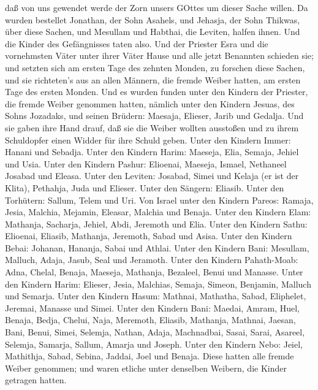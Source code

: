 daß von uns gewendet werde der Zorn unsers GOttes um dieser Sache
willen.  Da wurden bestellet Jonathan, der Sohn Asahels,
und Jehasja, der Sohn Thikwas, über diese Sachen, und Mesullam und
Habthai, die Leviten, halfen ihnen.  Und die Kinder des
Gefängnisses taten also. Und der Priester Esra und die vornehmsten Väter
unter ihrer Väter Hause und alle jetzt Benannten schieden sie; und
setzten sich am ersten Tage des zehnten Monden, zu forschen diese
Sachen,  und sie richteten's aus an allen Männern, die
fremde Weiber hatten, am ersten Tage des ersten Monden. 
Und es wurden funden unter den Kindern der Priester, die fremde Weiber
genommen hatten, nämlich unter den Kindern Jesuas, des Sohns Jozadaks,
und seinen Brüdern: Maesaja, Elieser, Jarib und Gedalja. 
Und sie gaben ihre Hand drauf, daß sie die Weiber wollten ausstoßen und
zu ihrem Schuldopfer einen Widder für ihre Schuld geben. 
Unter den Kindern Immer: Hanani und Sebadja.  Unter den
Kindern Harim: Maeseja, Elia, Semaja, Jehiel und Usia. 
Unter den Kindern Pashur: Elioenai, Maeseja, Ismael, Nethaneel Josabad
und Eleasa.  Unter den Leviten: Josabad, Simei und Kelaja
(er ist der Klita), Pethahja, Juda und Elieser.  Unter den
Sängern: Eliasib. Unter den Torhütern: Sallum, Telem und Uri.
 Von Israel unter den Kindern Pareos: Ramaja, Jesia,
Malchia, Mejamin, Eleasar, Malchia und Benaja.  Unter den
Kindern Elam: Mathanja, Sacharja, Jehiel, Abdi, Jeremoth und Elia.
 Unter den Kindern Sathu: Elioenai, Eliasib, Mathanja,
Jeremoth, Sabad und Asisa.  Unter den Kindern Bebai:
Johanan, Hananja, Sabai und Athlai.  Unter den Kindern
Bani: Mesullam, Malluch, Adaja, Jasub, Seal und Jeramoth. 
Unter den Kindern Pahath-Moab: Adna, Chelal, Benaja, Maeseja, Mathanja,
Bezaleel, Benui und Manasse.  Unter den Kindern Harim:
Elieser, Jesia, Malchias, Semaja, Simeon,  Benjamin,
Malluch und Semarja.  Unter den Kindern Hasum: Mathnai,
Mathatha, Sabad, Eliphelet, Jeremai, Manasse und Simei. 
Unter den Kindern Bani: Maedai, Amram, Huel,  Benaja,
Bedja, Chelui,  Naja, Meremoth, Eliasib, 
Mathanja, Mathnai, Jaesan,  Bani, Benui, Simei,
 Selemja, Nathan, Adaja,  Machnadbai, Sasai,
Sarai,  Asareel, Selemja, Samarja,  Sallum,
Amarja und Joseph.  Unter den Kindern Nebo: Jeiel,
Mathithja, Sabad, Sebina, Jaddai, Joel und Benaja.  Diese
hatten alle fremde Weiber genommen; und waren etliche unter denselben
Weibern, die Kinder getragen hatten.
